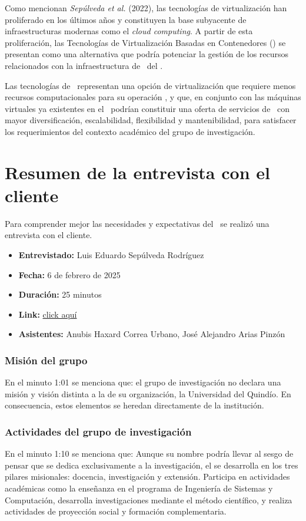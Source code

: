 Como mencionan \textit{Sepúlveda et al.} (2022), las tecnologías de virtualización han proliferado en los últimos años y constituyen la base subyacente de infraestructuras modernas como el \textit{cloud computing}. A partir de esta proliferación, las Tecnologías de Virtualización Basadas en Contenedores (\VBC) se presentan como una alternativa que podría potenciar la gestión de los recursos relacionados con la infraestructura de \TI\ del \GRID.

Las tecnologías de \VBC\ representan una opción de virtualización que requiere menos recursos computacionales para su operación \citep{Xavier2013}, y que, en conjunto con las máquinas virtuales ya existentes en el \GRID\, podrían constituir una oferta de servicios de \TI\ con mayor diversificación, escalabilidad, flexibilidad y mantenibilidad, para satisfacer los requerimientos del contexto académico del grupo de investigación.

\section{Resumen de la entrevista con el cliente}

Para comprender mejor las necesidades y expectativas del \GRID\, se realizó una entrevista con el cliente.

\begin{itemize}
  \item \textbf{Entrevistado:} Luis Eduardo Sepúlveda Rodríguez
  \item \textbf{Fecha:} 6 de febrero de 2025
  \item \textbf{Duración:} 25 minutos
  \item \textbf{Link:} \href{https://drive.google.com/file/d/1rIc9xOsyDqumlTV-QXcw0inPyIbSEHLz/view?usp=sharing}{click aquí}
  \item \textbf{Asistentes:} Anubis Haxard Correa Urbano, José Alejandro Arias Pinzón
\end{itemize}

\subsubsection{Misión del grupo \GRID}
En el minuto 1:01 se menciona que: el grupo de investigación no declara una misión y visión distinta a la de su organización, la Universidad del Quindío. En consecuencia, estos elementos se heredan directamente de la institución.

\subsubsection{Actividades del grupo de investigación}
En el minuto 1:10 se menciona que: Aunque su nombre podría llevar al sesgo de pensar que se dedica exclusivamente a la investigación, el \GRID se desarrolla en los tres pilares misionales: docencia, investigación y extensión. Participa en actividades académicas como la enseñanza en el programa de Ingeniería de Sistemas y Computación, desarrolla investigaciones mediante el método científico, y realiza actividades de proyección social y formación complementaria.

